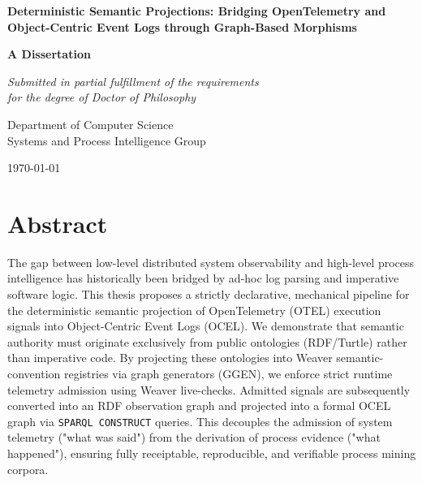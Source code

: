 \documentclass[12pt,a4paper,oneside]{book}
\begin{document}
\frontmatter

\begin{titlepage}
    \begin{center}
        \vspace*{1cm}
        
        \Huge
        \textbf{Deterministic Semantic Projections: Bridging OpenTelemetry and Object-Centric Event Logs through Graph-Based Morphisms}
        
        \vspace{1.5cm}
        
        \Large
        \textbf{A Dissertation}
        
        \vspace{1.5cm}
        
        \textit{Submitted in partial fulfillment of the requirements \\ for the degree of Doctor of Philosophy}
        
        \vspace{2cm}
        
        \Large
        Department of Computer Science \\
        Systems and Process Intelligence Group
        
        \vspace{1.5cm}
        
        \today
        
    \end{center}
\end{titlepage}

\chapter*{Abstract}
The gap between low-level distributed system observability and high-level process intelligence has historically been bridged by ad-hoc log parsing and imperative software logic. This thesis proposes a strictly declarative, mechanical pipeline for the deterministic semantic projection of OpenTelemetry (OTEL) execution signals into Object-Centric Event Logs (OCEL). We demonstrate that semantic authority must originate exclusively from public ontologies (RDF/Turtle) rather than imperative code. By projecting these ontologies into Weaver semantic-convention registries via graph generators (GGEN), we enforce strict runtime telemetry admission using Weaver live-checks. Admitted signals are subsequently converted into an RDF observation graph and projected into a formal OCEL graph via \texttt{SPARQL CONSTRUCT} queries. This decouples the admission of system telemetry ("what was said") from the derivation of process evidence ("what happened"), ensuring fully receiptable, reproducible, and verifiable process mining corpora.
\end{document}
